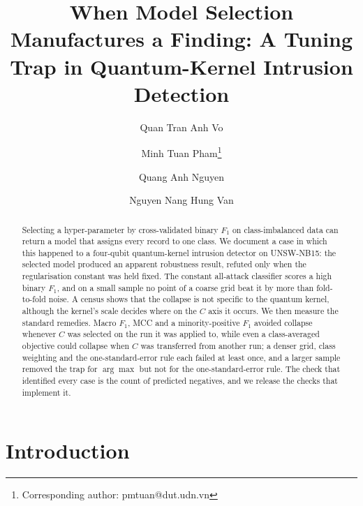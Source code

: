 \documentclass[runningheads]{llncs}
\newcommand{\Fone}{F_1}
\begin{document}
\title{When Model Selection Manufactures a Finding: A Tuning Trap in
Quantum-Kernel Intrusion Detection}

  \author{Quan Tran Anh Vo \and
          Minh Tuan Pham\thanks{Corresponding author: pmtuan@dut.udn.vn} \and
          Quang Anh Nguyen \and
          Nguyen Nang Hung Van}

\maketitle

\begin{abstract}
Selecting a hyper-parameter by cross-validated binary $\Fone$ on
class-imbalanced data can return a model that assigns every record to one
class. We document a case in which this happened to a four-qubit
quantum-kernel intrusion detector on UNSW-NB15: the selected model produced an
apparent robustness result, refuted only when the regularisation constant was
held fixed. The constant all-attack classifier scores a high binary $\Fone$,
and on a small sample no point of a coarse grid beat it by more than
fold-to-fold noise. A census shows that the collapse is not specific to the
quantum kernel, although the kernel's scale decides where on the $C$ axis it
occurs. We then measure the standard remedies. Macro $\Fone$, MCC and a
minority-positive $\Fone$ avoided collapse whenever $C$ was selected on the
run it was applied to, while even a class-averaged objective could collapse
when $C$ was transferred from another run; a denser grid, class weighting and the one-standard-error rule
each failed at least once, and a larger sample removed the trap for
$\arg\max$ but not for the one-standard-error rule. The check that identified every case is the count of predicted
negatives, and we release the checks that implement it.
\end{abstract}

\section{Introduction}\label{sec:intro}
\end{document}
